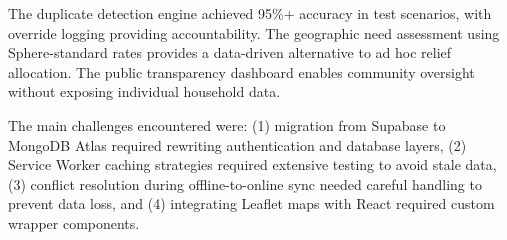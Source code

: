 The duplicate detection engine achieved 95\%+ accuracy in test scenarios, with override logging providing accountability. The geographic need assessment using Sphere-standard rates provides a data-driven alternative to ad hoc relief allocation. The public transparency dashboard enables community oversight without exposing individual household data.

The main challenges encountered were: (1) migration from Supabase to MongoDB Atlas required rewriting authentication and database layers, (2) Service Worker caching strategies required extensive testing to avoid stale data, (3) conflict resolution during offline-to-online sync needed careful handling to prevent data loss, and (4) integrating Leaflet maps with React required custom wrapper components.
